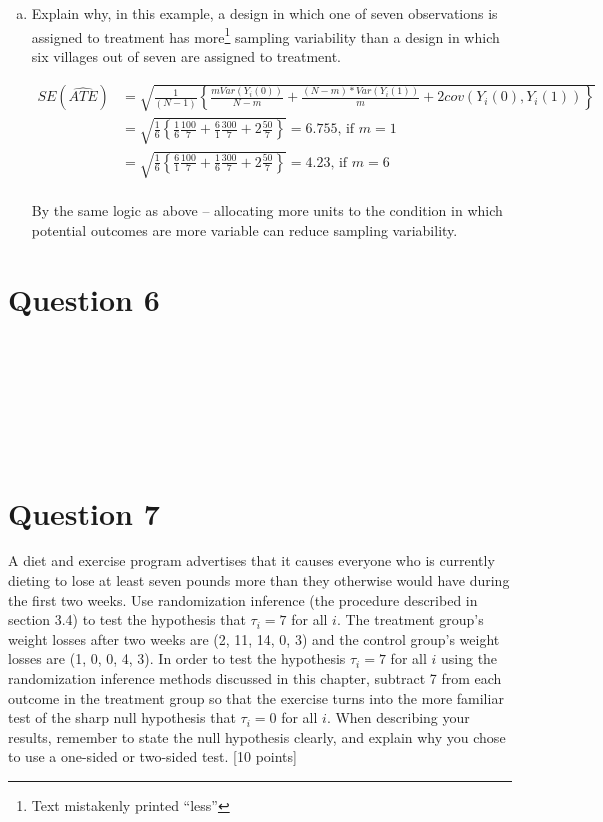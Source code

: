 \documentclass[11pt,notitlepage]{article}\usepackage[]{graphicx}\usepackage[]{color}
\makeatletter
\newenvironment{kframe}{%
 \def\at@end@of@kframe{}%
 \ifinner\ifhmode%
  \def\at@end@of@kframe{\end{minipage}}%
  \begin{minipage}{\columnwidth}%
 \fi\fi%
 \def\FrameCommand##1{\hskip\@totalleftmargin \hskip-\fboxsep
 \colorbox{shadecolor}{##1}\hskip-\fboxsep
     \hskip-\linewidth \hskip-\@totalleftmargin \hskip\columnwidth}%
 \MakeFramed {\advance\hsize-\width
   \@totalleftmargin\z@ \linewidth\hsize
   \@setminipage}}%
 {\par\unskip\endMakeFramed%
 \at@end@of@kframe}
\newenvironment{knitrout}{}{} %
\makeatother
\begin{document}
\begin{enumerate}[a)]
\item Explain why, in this example, a design in which one of seven observations is assigned to treatment has more\footnote{Text mistakenly printed ``less''} sampling variability than a design in which six villages out of seven are assigned to treatment.  

\begin{align*}
SE(\widehat{ATE}) &= \sqrt{\frac{1}{(N-1)} \left \{ \frac{mVar(Y_i (0))}{N- m} + \frac{(N-m)*Var(Y_i (1))}{m} + 2cov(Y_i(0), Y_i(1))\right \}} \\
&= \sqrt{\frac{1}{6} \left \{ \frac{1}{6}\frac{100}{7} + \frac{6}{1}\frac{300}{7} + 2\frac{50}{7}\right \}} = 6.755 \text{, if $m = 1$} \\
&= \sqrt{\frac{1}{6} \left \{ \frac{6}{1}\frac{100}{7} + \frac{1}{6}\frac{300}{7} + 2\frac{50}{7}\right \}} = 4.23 \text{, if $m = 6$} \\
\end{align*}

By the same logic as above -- allocating more units to the condition in which potential outcomes are more variable can reduce sampling variability.

\end{enumerate}

\section*{Question 6}
\begin{knitrout}
\color{fgcolor}\begin{kframe}
\begin{verbatim}








\end{verbatim}
\end{kframe}
\end{knitrout}

\section*{Question 7}
A diet and exercise program advertises that it causes everyone who is currently dieting to lose at least seven pounds more than they otherwise would have during the first two weeks.  Use randomization inference (the procedure described in section 3.4) to test the hypothesis that $\tau_i=7$ for all $i$.  The treatment group's weight losses after two weeks are (2, 11, 14, 0, 3) and the control group's weight losses are (1, 0, 0, 4, 3).  In order to test the hypothesis $\tau_i=7$ for all $i$ using the randomization inference methods discussed in this chapter, subtract 7 from each outcome in the treatment group so that the exercise turns into the more familiar test of the sharp null hypothesis that $\tau_i=0$ for all $i$. When describing your results, remember to state the null hypothesis clearly, and explain why you chose to use a one-sided or two-sided test. [10 points]
\end{document}
